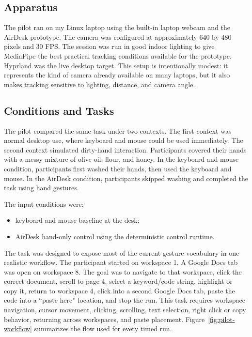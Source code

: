 \documentclass[manuscript]{acmart}
\begin{document}
\subsection{Apparatus}

The pilot ran on my Linux laptop using the built-in laptop webcam and the AirDesk prototype. The camera was configured at approximately 640 by 480 pixels and 30 FPS. The session was run in good indoor lighting to give MediaPipe the best practical tracking conditions available for the prototype. Hyprland was the live desktop target. This setup is intentionally modest: it represents the kind of camera already available on many laptops, but it also makes tracking sensitive to lighting, distance, and camera angle.

\subsection{Conditions and Tasks}

The pilot compared the same task under two contexts. The first context was normal desktop use, where keyboard and mouse could be used immediately. The second context simulated dirty-hand interaction. Participants covered their hands with a messy mixture of olive oil, flour, and honey. In the keyboard and mouse condition, participants first washed their hands, then used the keyboard and mouse. In the AirDesk condition, participants skipped washing and completed the task using hand gestures.

The input conditions were:

\begin{itemize}
  \item keyboard and mouse baseline at the desk;
  \item AirDesk hand-only control using the deterministic control runtime.
\end{itemize}

The task was designed to expose most of the current gesture vocabulary in one realistic workflow. The participant started on workspace 1. A Google Docs tab was open on workspace 8. The goal was to navigate to that workspace, click the correct document, scroll to page 4, select a keyword/code string, highlight or copy it, return to workspace 4, click into a second Google Docs tab, paste the code into a ``paste here'' location, and stop the run. This task requires workspace navigation, cursor movement, clicking, scrolling, text selection, right click or copy behavior, returning across workspaces, and paste placement. Figure~\ref{fig:pilot-workflow} summarizes the flow used for every timed run.
\end{document}
